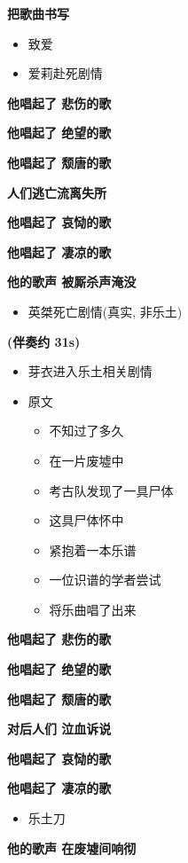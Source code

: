 \documentclass[a4paper]{article}
\begin{document}
\textbf{把歌曲书写}

\begin{itemize}
    \item 致爱
    \item 爱莉赴死剧情
\end{itemize}

\textbf{他唱起了 悲伤的歌}

\textbf{他唱起了 绝望的歌}

\textbf{他唱起了 颓唐的歌}

\textbf{人们逃亡流离失所}

\textbf{他唱起了 哀恸的歌}

\textbf{他唱起了 凄凉的歌}

\textbf{他的歌声 被厮杀声淹没}

\begin{itemize}
    \item 英桀死亡剧情(真实, 非乐土)
\end{itemize}

\textbf{(伴奏约 31s)}

\begin{itemize}
    \item 芽衣进入乐土相关剧情
    \item 原文
    \begin{itemize}
        \item 不知过了多久
        \item 在一片废墟中
        \item 考古队发现了一具尸体
        \item 这具尸体怀中
        \item 紧抱着一本乐谱
        \item 一位识谱的学者尝试
        \item 将乐曲唱了出来
    \end{itemize}
\end{itemize}

\textbf{他唱起了 悲伤的歌}

\textbf{他唱起了 绝望的歌}

\textbf{他唱起了 颓唐的歌}

\textbf{对后人们 泣血诉说}

\textbf{他唱起了 哀恸的歌}

\textbf{他唱起了 凄凉的歌}

\begin{itemize}
    \item 乐土刀
\end{itemize}

\textbf{他的歌声 在废墟间响彻}
\end{document}
